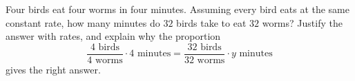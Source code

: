 Four birds eat four worms in four minutes. Assuming every bird eats at the same constant rate, how many minutes do $32$ birds take to eat $32$ worms? Justify the answer with rates, and explain why the proportion
\[
\dfrac{4\text{ birds}}{4\text{ worms}}\cdot4\text{ minutes}=\dfrac{32\text{ birds}}{32\text{ worms}}\cdot y\text{ minutes}
\]
gives the right answer.
